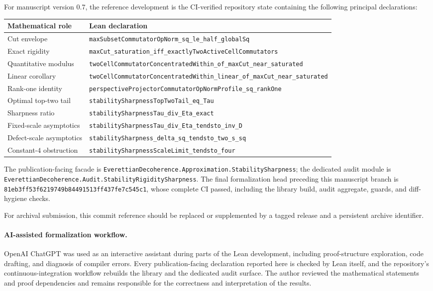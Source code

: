 \documentclass[11pt]{article}
\begin{document}
For manuscript version 0.7, the reference development is the CI-verified
repository state containing the following principal declarations:
\begin{center}
\begin{tabular}{p{}p{}}
\hline
Mathematical role & Lean declaration\\
\hline
Cut envelope &
\texttt{maxSubsetCommutatorOpNorm\_sq\_le\_half\_globalSq}\\
Exact rigidity &
\texttt{maxCut\_saturation\_iff\_exactlyTwoActiveCellCommutators}\\
Quantitative modulus &
\texttt{twoCellCommutatorConcentratedWithin\_of\_maxCut\_near\_saturated}\\
Linear corollary &
\texttt{twoCellCommutatorConcentratedWithin\_linear\_of\_maxCut\_near\_saturated}\\
Rank-one identity &
\texttt{perspectiveProjectorCommutatorOpNormProfile\_sq\_rankOne}\\
Optimal top-two tail &
\texttt{stabilitySharpnessTopTwoTail\_eq\_Tau}\\
Sharpness ratio &
\texttt{stabilitySharpnessTau\_div\_Eta\_exact}\\
Fixed-scale asymptotics &
\texttt{stabilitySharpnessTau\_div\_Eta\_tendsto\_inv\_D}\\
Defect-scale asymptotics &
\texttt{stabilitySharpness\_delta\_sq\_tendsto\_two\_s\_sq}\\
Constant-$4$ obstruction &
\texttt{stabilitySharpnessScaleLimit\_tendsto\_four}\\
\hline
\end{tabular}
\end{center}

The publication-facing facade is
\texttt{EverettianDecoherence.Approximation.StabilitySharpness}; the dedicated
audit module is
\texttt{EverettianDecoherence.Audit.StabilityRigiditySharpness}.
The final formalization head preceding this manuscript branch is
\texttt{81eb3ff53f6219749b84491513ff437fe7c545c1}, whose complete CI passed,
including the library build, audit aggregate, guards, and diff-hygiene checks.

For archival submission, this commit reference should be replaced or
supplemented by a tagged release and a persistent archive identifier.

\paragraph{AI-assisted formalization workflow.}
OpenAI ChatGPT was used as an interactive assistant during parts of the Lean
development, including proof-structure exploration, code drafting, and
diagnosis of compiler errors. Every publication-facing declaration reported
here is checked by Lean itself, and the repository's continuous-integration
workflow rebuilds the library and the dedicated audit surface. The author
reviewed the mathematical statements and proof dependencies and remains
responsible for the correctness and interpretation of the results.
\end{document}
